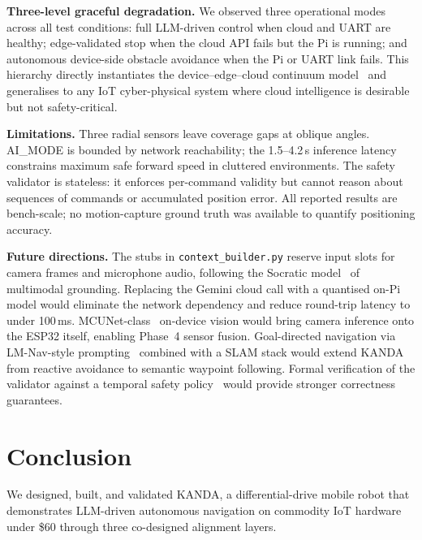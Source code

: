 \documentclass[conference]{IEEEtran}
\begin{document}
\textbf{Three-level graceful degradation.}
We observed three operational modes across all test conditions: full
LLM-driven control when cloud and UART are healthy; edge-validated stop when
the cloud API fails but the Pi is running; and autonomous device-side obstacle
avoidance when the Pi or UART link fails.
This hierarchy directly instantiates the device--edge--cloud continuum
model~\cite{bonomi2012fog,shi2016edge} and generalises to any IoT
cyber-physical system where cloud intelligence is desirable but not
safety-critical.

\textbf{Limitations.}
Three radial sensors leave coverage gaps at oblique angles.
AI\_MODE is bounded by network reachability; the 1.5--4.2\,s inference latency
constrains maximum safe forward speed in cluttered environments.
The safety validator is stateless: it enforces per-command validity but
cannot reason about sequences of commands or accumulated position error.
All reported results are bench-scale; no motion-capture ground truth was
available to quantify positioning accuracy.

\textbf{Future directions.}
The stubs in \texttt{context\_builder.py} reserve input slots for camera frames
and microphone audio, following the Socratic model~\cite{zeng2023socratic} of
multimodal grounding.
Replacing the Gemini cloud call with a quantised on-Pi model would eliminate
the network dependency and reduce round-trip latency to under 100\,ms.
MCUNet-class~\cite{lin2020mcunet} on-device vision would bring camera
inference onto the ESP32 itself, enabling Phase~4 sensor fusion.
Goal-directed navigation via LM-Nav-style prompting~\cite{shah2022lmnav}
combined with a SLAM stack would extend KANDA from reactive avoidance to
semantic waypoint following.
Formal verification of the validator against a temporal safety
policy~\cite{amodei2016safety} would provide stronger correctness guarantees.

\section{Conclusion}
\label{sec:conclusion}

We designed, built, and validated KANDA, a differential-drive mobile robot
that demonstrates LLM-driven autonomous navigation on commodity IoT hardware
under \$60 through three co-designed alignment layers.
\end{document}
